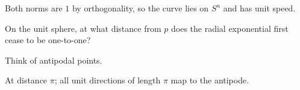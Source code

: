 \begin{solution}
Both norms are \(1\) by orthogonality, so the curve lies on \(S^n\) and has unit speed.
\end{solution}

\begin{exercise}\label{exr:vii23-ped-16}
On the unit sphere, at what distance from \(p\) does the radial exponential first cease to be one-to-one?
\end{exercise}

\begin{hint}
Think of antipodal points.
\end{hint}

\begin{solution}
At distance \(\pi\); all unit directions of length \(\pi\) map to the antipode.
\end{solution}

